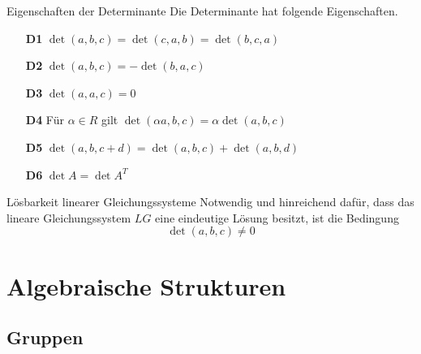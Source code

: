 \documentclass[german]{spicker}
\begin{document}
\begin{defi}{Eigenschaften der Determinante}
    Die Determinante hat folgende Eigenschaften.
    \begin{itemize}
        \item[\textbf{D1}] $\det(a, b, c) = \det(c, a, b) = \det(b, c, a)$
        \item[\textbf{D2}] $\det(a, b, c) = - \det(b, a, c)$
        \item[\textbf{D3}] $\det(a, a, c) = 0$
        \item[\textbf{D4}] Für $\alpha \in R$ gilt $\det(\alpha a, b, c) = \alpha \det(a, b, c)$
        \item[\textbf{D5}] $\det(a,b, c + d) = \det(a, b, c) + \det(a, b, d)$
        \item[\textbf{D6}] $\det A = \det A^T$
    \end{itemize}
\end{defi}

\begin{bonus}{Lösbarkeit linearer Gleichungssysteme}
    Notwendig und hinreichend dafür, dass das lineare Gleichungssystem $LG$ eine eindeutige Lösung besitzt, ist die Bedingung
    $$
        \det(a, b, c) \neq 0
    $$
\end{bonus}

\newpage
\section{Algebraische Strukturen}
\subsection{Gruppen}
\end{document}
